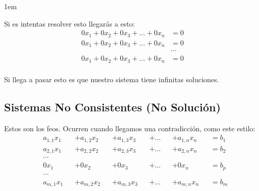 \documentclass[12pt]{report}                                    %
\newenvironment{SmallIndentation}[1][0.75em]                    %
    {\begin{adjustwidth}{#1}{}\begin{footnotesize}}                 %
    {\end{footnotesize}\end{adjustwidth}}                           %
\begin{document}
\begin{itemize}
\begin{SmallIndentation}[1em]
                            Si es intentas resolver esto llegarás a esto:
                            \begin{equation*}
                            \begin{split}
                                0x_1   + 0x_2 + 0x_3 + \dots + 0x_n &= 0    \\
                                0x_1   + 0x_2 + 0x_3 + \dots + 0x_n &= 0    \\
                                &\cdots                                     \\
                                0x_1   + 0x_2 + 0x_3 + \dots + 0x_n &= 0    \\
                            \end{split}
                            \end{equation*}

                            Si llega a pasar esto es que nuestro sistema tiene infinitas soluciones.

                        \end{SmallIndentation}

                \end{itemize}



            \clearpage
            \subsection{Sistemas No Consistentes (No Solución)}

                Estos son los feos.
                Ocurren cuando llegamos una contradicción, como este estilo:
                \begin{equation}
                \begin{split}
                    & a_{1,1}x_1 &&+ a_{1,2}x_2 &&+ a_{1,3}x_3 &&+ \dots &&+ a_{1,n}x_n &&= b_1 \\
                    & a_{2,1}x_1 &&+ a_{2,2}x_2 &&+ a_{2,3}x_3 &&+ \dots &&+ a_{2,n}x_n &&= b_2 \\
                    &\cdots                                                                     \\
                    & 0x_1       &&+ 0x_2       &&+ 0x_3       &&+ \dots &&+ 0x_n       &&= b_p \\
                    &\cdots                                                                     \\
                    & a_{m,1}x_1 &&+ a_{m,2}x_2 &&+ a_{m,3}x_3 &&+ \dots &&+ a_{m,n}x_n &&= b_m \\
                \end{split}
                \end{equation}
\end{document}
